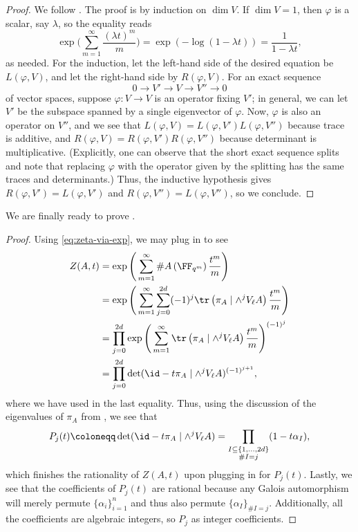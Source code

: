 \documentclass{amsart}
\begin{document}
\begin{proof}
	We follow \cite[Lemma~C.4.1]{hartshorne}. The proof is by induction on $\dim V$. If $\dim V=1$, then $\varphi$ is a scalar, say $\lambda$, so the equality reads
	\[\exp\Bigg(\sum_{m=1}^\infty\frac{(\lambda t)^m}m\Bigg)=\exp(-\log(1-\lambda t))=\frac1{1-\lambda t},\]
	as needed. For the induction, let the left-hand side of the desired equation be $L(\varphi,V)$, and let the right-hand side by $R(\varphi,V)$. For an exact sequence
	\[0\to V'\to V\to V''\to0\]
	of vector spaces, suppose $\varphi\colon V\to V$ is an operator fixing $V'$; in general, we can let $V'$ be the subspace spanned by a single eigenvector of $\varphi$. Now, $\varphi$ is also an operator on $V''$, and we see that $L(\varphi,V)=L(\varphi,V')L(\varphi,V'')$ because trace is additive, and $R(\varphi,V)=R(\varphi,V')R(\varphi,V'')$ because determinant is multiplicative. (Explicitly, one can observe that the short exact sequence splits and note that replacing $\varphi$ with the operator given by the splitting has the same traces and determinants.) Thus, the inductive hypothesis gives $R(\varphi,V')=L(\varphi,V')$ and $R(\varphi,V'')=L(\varphi,V'')$, so we conclude.
\end{proof}
We are finally ready to prove .
\ratforabvar*
\begin{proof}
	Using \eqref{eq:zeta-via-exp}, we may plug in  to see
	\begin{align*}
		Z(A,t) &= \exp\Bigg(\sum_{m=1}^\infty\#A\left(\FF_{q^m}\right)\frac{t^m}m\Bigg) \\
		&= \exp\Bigg(\sum_{m=1}^\infty\sum_{j=0}^{2d}(-1)^j\tr\left(\pi_A\mid\wedge^jV_\ell A\right)\frac{t^m}m\Bigg) \\
		&= \prod_{j=0}^{2d}\exp\Bigg(\sum_{m=1}^\infty\tr\left(\pi_A\mid\wedge^jV_\ell A\right)\frac{t^m}m\Bigg)^{(-1)^j} \\
		&= \prod_{j=0}^{2d}\det({\id}-t\pi_A\mid\wedge^jV_\ell A)^{(-1)^{j+1}},
	\end{align*}
	where we have used  in the last equality. Thus, using the discussion of the eigenvalues of $\pi_A$ from , we see that
	\[P_j(t)\coloneqq\det({\id}-t\pi_A\mid\wedge^jV_\ell A)=\prod_{\substack{I\subseteq\{1,\ldots,2d\}\\\#I=j}}(1-t\alpha_I),\]
	which finishes the rationality of $Z(A,t)$ upon plugging in for $P_j(t)$. Lastly, we see that the coefficients of $P_j(t)$ are rational because any Galois automorphism will merely permute $\{\alpha_i\}_{i=1}^n$ and thus also permute $\{\alpha_I\}_{\#I=j}$. Additionally, all the coefficients are algebraic integers, so $P_j$ as integer coefficients.
\end{proof}
\end{document}
